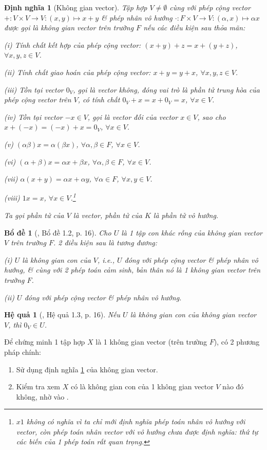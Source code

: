 \documentclass{article}
\newtheorem{bode}{Bổ đề}
\newtheorem{dinhnghia}{Định nghĩa}
\newtheorem{hequa}{Hệ quả}
\begin{document}
\begin{dinhnghia}[Không gian vector]
	\label{def: vector space}
	Tập hợp $V\ne\emptyset$ cùng với {\rm phép cộng vector} $+:V\times V\to V:(x,y)\mapsto x + y$ \& {\rm phép nhân vô hướng} $\cdot:F\times V\to V:(\alpha,x)\mapsto\alpha x$ được gọi là {\rm không gian vector} trên trường $F$ nếu các điều kiện sau thỏa mãn:
	\item(i) Tính chất kết hợp của phép cộng vector: $(x + y) + z = x + (y + z)$, $\forall x,y,z\in V$.
	\item(ii) Tính chất giao hoán của phép cộng vector: $x + y = y + x$, $\forall x,y,z\in V$.
	\item(iii) Tồn tại vector $0_V$, gọi là {\rm vector không}, đóng vai trò là phần tử trung hòa của phép cộng vector trên $V$, có tính chất $0_V + x = x + 0_V = x$, $\forall x\in V$.
	\item(iv) Tồn tại vector $-x\in V$, gọi là {\rm vector đối} của vector $x\in V$, sao cho $x + (-x) = (-x) + x = 0_V$, $\forall x\in V$.
	\item(v) $(\alpha\beta)x = \alpha(\beta x)$, $\forall\alpha,\beta\in F$, $\forall x\in V$.
	\item(vi) $(\alpha + \beta)x = \alpha x + \beta x$, $\forall\alpha,\beta\in F$, $\forall x\in V$.
	\item(vii) $\alpha(x + y) = \alpha x + \alpha y$, $\forall\alpha\in F$, $\forall x,y\in V$.
	\item(viii) $1x = x$, $\forall x\in V$.\footnote{$x1$ không có nghĩa vì ta chỉ mới định nghĩa phép toán nhân vô hướng với vector, còn phép toán nhân vector với vô hướng chưa được định nghĩa: thứ tự các biến của 1 phép toán rất quan trọng.}
	
	Ta gọi phần tử của $V$ là {\rm vector}, phần tử của $K$ là {\rm phần tử vô hướng}.
\end{dinhnghia}

\begin{bode}[\cite{Hoa_linear_algebra}, Bổ đề 1.2, p. 16]
	Cho $U$  là 1 tập con khác rỗng của không gian vector $V$ trên trường $F$. 2 điều kiện sau là tương đương:
	\item(i) $U$ là không gian con của $V$, i.e., $U$ đóng với phép cộng vector \& phép nhân vô hướng, \& cùng với 2 phép toán cảm sinh, bản thân nó là 1 không gian vector trên trường $F$.
	\item(ii) $U$ đóng với phép cộng vector \& phép nhân vô hướng.
\end{bode}

\begin{hequa}[\cite{Hoa_linear_algebra}, Hệ quả 1.3, p. 16]
	Nếu $U$ là không gian con của không gian vector $V$, thì $0_V\in U$.
\end{hequa}
Để chứng minh 1 tập hợp $X$ là 1 không gian vector (trên trường $F$), có 2 phương pháp chính:
\begin{enumerate}
	\item Sử dụng định nghĩa \ref{def: vector space} của không gian vector.
	\item Kiểm tra xem $X$ có là không gian con của 1 không gian vector $V$ nào đó không, nhờ vào \cite[Bổ đề 1.2, p. 16]{Hoa_linear_algebra}.
\end{enumerate}
\end{document}
